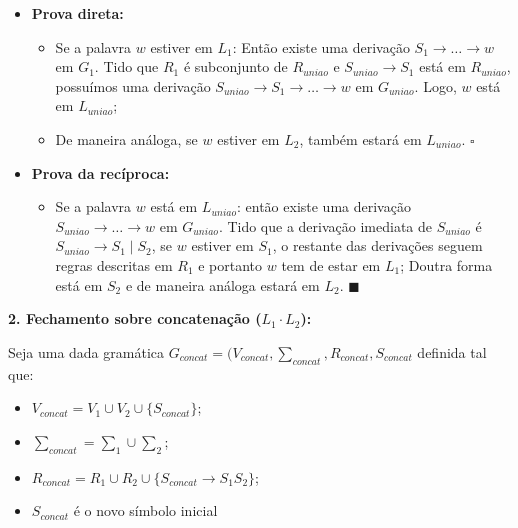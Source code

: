\documentclass[12pt]{article}
\begin{document}
\begin{enumerate}
	      \begin{itemize}
		      \item \textbf{Prova direta:}
		            \begin{itemize}
			            \item Se a palavra $w$ estiver em $L_1$: Então existe uma
			                  derivação $S_1 \rightarrow \dots \rightarrow w$ em
			                  $G_1$. Tido que $R_1$ é subconjunto de $R_{uniao}$ e
			                  $S_{uniao} \rightarrow S_1$ está em $R_{uniao}$,
			                  possuímos uma derivação $S_{uniao} \rightarrow S_1
				                  \rightarrow \dots \rightarrow w$ em $G_{uniao}$. Logo,
			                  $w$ está em $L_{uniao}$;
			            \item De maneira análoga, se $w$ estiver em $L_2$, também
			                  estará em $L_{uniao}$. $\square$
		            \end{itemize}
		      \item \textbf{Prova da recíproca:}
		            \begin{itemize}
			            \item Se a palavra $w$ está em $L_{uniao}$: então existe
			                  uma derivação $S_{uniao} \rightarrow \dots \rightarrow
				                  w$ em $G_{uniao}$. Tido que a derivação imediata de
			                  $S_{uniao}$ é $S_{uniao} \rightarrow S_1 \mid S_2$, se
			                  $w$ estiver em $S_1$, o restante das derivações
			                  seguem regras descritas em $R_1$ e portanto $w$ tem
			                  de estar em $L_1$; Doutra forma está em $S_2$ e de
			                  maneira análoga estará em $L_2$. $\blacksquare$
		            \end{itemize}
	      \end{itemize}
	      
	      \textbf{2. Fechamento sobre concatenação ($L_1 \cdot L_2$):}
	      
	      Seja uma dada gramática $G_{concat} = (V_{concat}, \sum_{concat},
		      R_{concat}, S_{concat}$ definida tal que:
	      
	      \begin{itemize}
		      \item $V_{concat} = V_1 \cup V_2 \cup \{S_{concat}\}$;
		      \item $\sum_{concat} = \sum_1 \cup \sum_2$;
		      \item $R_{concat} = R_1 \cup R_2 \cup \{S_{concat} \rightarrow
			            S_1S_2\}$;
		      \item $S_{concat}$ é o novo símbolo inicial
	      \end{itemize}
	      

\end{enumerate}
\end{document}
